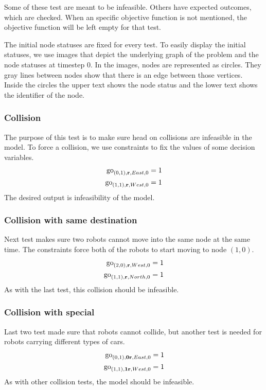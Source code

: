 Some of these test are meant to be infeasible. Others have expected outcomes,
which are checked. When an specific objective function is not mentioned, the
objective function will be left empty for that test.

The initial node statuses are fixed for every test. To easily display the
initial statuses, we use images that depict the underlying graph of the problem
and the node statuses at timestep 0. In the images, nodes are represented as
circles. They gray lines between nodes show that there is an edge between those
vertices. Inside the circles the upper text shows the node status and the lower
text shows the identifier of the node.
\subsubsection{Collision}
The purpose of this test is to make sure head on collisions are infeasible in
the model.
To force a collision, we use constraints to fix the values of some decision
variables.
\begin{align}
    \mathrm{go}_{(0,1),\text{\bf r},East,0} &= 1\\
    \mathrm{go}_{(1,1),\text{\bf r},West,0} &= 1
\end{align}
The desired output is infeasibility of the model.
\subsubsection{Collision with same destination}
Next test makes sure two robots cannot move into the same node at the same
time.
The constraints force both of the robots to start moving to node $(1,0)$.
\begin{align}
    \mathrm{go}_{(2,0),\text{\bf r},West,0} &= 1\\
    \mathrm{go}_{(1,1),\text{\bf r},North,0} &= 1
\end{align}
As with the last test, this collision should be infeasible.
\subsubsection{Collision with special}
Last two test made sure that robots cannot collide, but another test is needed
for robots carrying different types of cars.
\begin{align}
    \mathrm{go}_{(0,1),\text{\bf 0r},East,0} &= 1\\
    \mathrm{go}_{(1,1),\text{\bf 1r},West,0} &= 1
\end{align}
As with other collision tests, the model should be infeasible.
